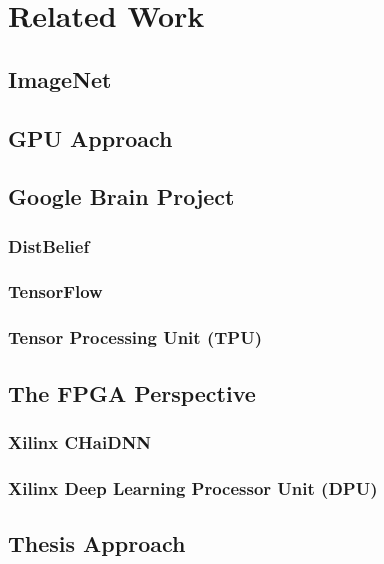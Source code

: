 \chapter{Related Work}

\label{Chapter-Related-Work}

\section{ImageNet}


\section{GPU Approach}

\section{Google Brain Project}
\subsection{DistBelief}
\subsection{TensorFlow}
\subsection{Tensor Processing Unit (TPU)}

\section{The FPGA Perspective}
\subsection{Xilinx CHaiDNN}
\subsection{Xilinx Deep Learning Processor Unit (DPU)}

\section{Thesis Approach}
